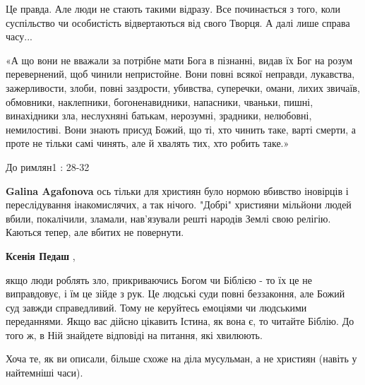 \begin{itemize}
Це правда. Але люди не стають такими відразу. Все починається з того, коли
суспільство чи особистість відвертаються від свого Творця. А далі лише справа
часу...

«А що вони не вважали за потрібне мати Бога в пізнанні, видав їх Бог на розум
перевернений, щоб чинили непристойне. Вони повні всякої неправди, лукавства,
зажерливости, злоби, повні заздрости, убивства, суперечки, омани, лихих
звичаїв, обмовники, наклепники, богоненавидники, напасники, чваньки, пишні,
винахідники зла, неслухняні батькам, нерозумні, зрадники, нелюбовні,
немилостиві. Вони знають присуд Божий, що ті, хто чинить таке, варті смерти, а
проте не тільки самі чинять, але й хвалять тих, хто робить таке.»

До римлян1 : 28-32

\begin{itemize}
 
\textbf{Galina Agafonova} ось тільки для християн було нормою вбивство
іновірців і переслідування інакомислячих, а так нічого. "Добрі" християни
мільйони людей вбили, покалічили, зламали, нав'язували решті народів Землі свою
релігію. Каються тепер, але вбитих не повернути.

 
\textbf{Ксенія Педаш} , 

якщо люди роблять зло, прикриваючись Богом чи Біблією - то їх це не
виправдовує, і їм це зійде з рук. Це людські суди повні беззаконня, але Божий
суд завжди справедливий. Тому не керуйтесь емоціями чи людськими переданнями.
Якщо вас дійсно цікавить Істина, як вона є, то читайте Біблію. До того ж, в Ній
знайдете відповіді на питання, які хвилюють.

Хоча те, як ви описали, більше схоже на діла мусульман, а не християн (навіть у найтемніші часи).

 

\end{itemize}
\end{itemize}
